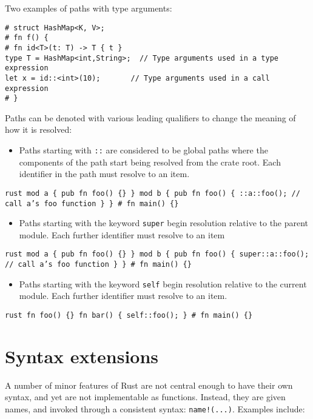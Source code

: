 \documentclass[]{article}
\begin{document}
Two examples of paths with type arguments:

\begin{verbatim}
# struct HashMap<K, V>;
# fn f() {
# fn id<T>(t: T) -> T { t }
type T = HashMap<int,String>;  // Type arguments used in a type expression
let x = id::<int>(10);       // Type arguments used in a call expression
# }
\end{verbatim}

Paths can be denoted with various leading qualifiers to change the
meaning of how it is resolved:

\begin{itemize}
\itemsep1pt\parskip0pt
\item
  Paths starting with \texttt{::} are considered to be global paths
  where the components of the path start being resolved from the crate
  root. Each identifier in the path must resolve to an item.
\end{itemize}

\texttt{rust   mod a \{       pub fn foo() \{\}   \}   mod b \{       pub fn foo() \{           ::a::foo(); // call a's foo function       \}   \}   \# fn main() \{\}}

\begin{itemize}
\itemsep1pt\parskip0pt
\item
  Paths starting with the keyword \texttt{super} begin resolution
  relative to the parent module. Each further identifier must resolve to
  an item
\end{itemize}

\texttt{rust   mod a \{       pub fn foo() \{\}   \}   mod b \{       pub fn foo() \{           super::a::foo(); // call a's foo function       \}   \}   \# fn main() \{\}}

\begin{itemize}
\itemsep1pt\parskip0pt
\item
  Paths starting with the keyword \texttt{self} begin resolution
  relative to the current module. Each further identifier must resolve
  to an item.
\end{itemize}

\texttt{rust   fn foo() \{\}   fn bar() \{       self::foo();   \}   \# fn main() \{\}}

\section{Syntax extensions}\label{syntax-extensions}

A number of minor features of Rust are not central enough to have their
own syntax, and yet are not implementable as functions. Instead, they
are given names, and invoked through a consistent syntax:
\texttt{name!(...)}. Examples include:
\end{document}
